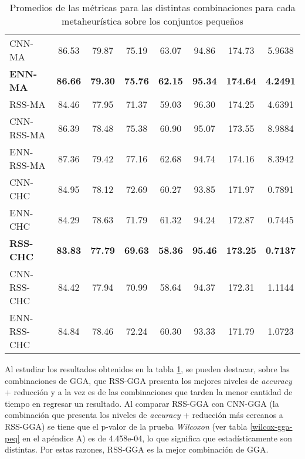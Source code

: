 \begin{table}[h!]
\begin{adjustbox}{max width =\textwidth}
\begin{tabular}{l c c c c c c c}
\hline

CNN-MA & 86.53 & 79.87 & 75.19 & 63.07 & 94.86 & 174.73 & 5.9638 \\
\textbf{ENN-MA} & \textbf{86.66} & \textbf{79.30} & \textbf{75.76} & \textbf{62.15} & \textbf{95.34} & \textbf{174.64} & \textbf{4.2491} \\
RSS-MA & 84.46 & 77.95 & 71.37 & 59.03 & 96.30 & 174.25 & 4.6391 \\
CNN-RSS-MA  & 86.39 & 78.48 & 75.38 & 60.90 & 95.07 & 173.55 & 8.9884 \\
ENN-RSS-MA & 87.36 & 79.42 & 77.16 & 62.68 & 94.74 & 174.16 & 8.3942 \\

\hline

CNN-CHC & 84.95 & 78.12 & 72.69 & 60.27 & 93.85 & 171.97 & 0.7891 \\
ENN-CHC & 84.29 & 78.63 & 71.79 & 61.32 & 94.24 & 172.87 & 0.7445 \\
\textbf{RSS-CHC} & \textbf{83.83} & \textbf{77.79} & \textbf{69.63} & \textbf{58.36} & \textbf{95.46} & \textbf{173.25} & \textbf{0.7137} \\
CNN-RSS-CHC  & 84.42 & 77.94 & 70.99 & 58.64 & 94.37 & 172.31 & 1.1144 \\
ENN-RSS-CHC & 84.84 & 78.46 & 72.24 & 60.30 & 93.33 & 171.79 & 1.0723 \\

\hline
\end{tabular}
\end{adjustbox}
\caption{Promedios de las métricas para las distintas combinaciones para cada metaheurística sobre los conjuntos pequeños}
\label{peq-all}

\end{table}

Al estudiar los resultados obtenidos en la tabla \ref{peq-all}, se pueden destacar, sobre las combinaciones de GGA, que RSS-GGA presenta los mejores niveles de \emph{accuracy} + reducción y a la vez es de las combinaciones que tarden la menor cantidad de tiempo en regresar un resultado. Al comparar RSS-GGA con CNN-GGA (la combinación que presenta los niveles de \emph{accuracy} + reducción más cercanos a RSS-GGA) se tiene que el p-valor de la prueba \emph{Wilcoxon} (ver tabla \ref{wilcox-gga-peq} en el apéndice A) es de 4.458e-04, lo que significa que estadísticamente son distintas. Por estas razones, RSS-GGA es la mejor combinación de GGA.


